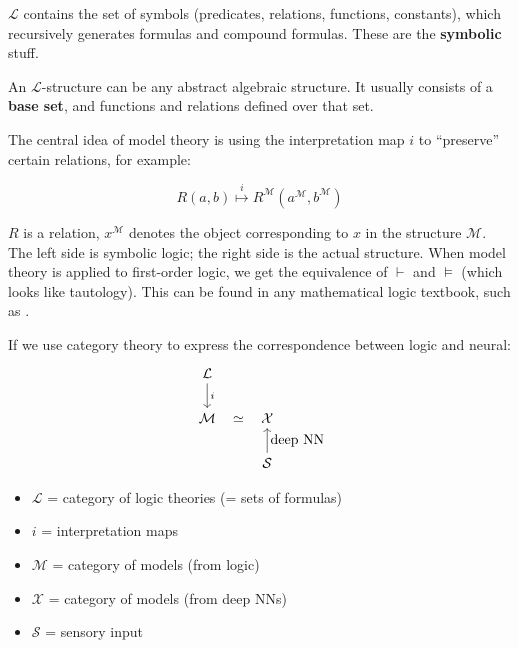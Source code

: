 \documentclass[orivec]{llncs}
\begin{document}
$\mathcal{L}$ contains the set of symbols (predicates, relations, functions, constants), which recursively generates formulas and compound formulas.  These are the \textbf{symbolic} stuff.


An $\mathcal{L}$-structure can be any abstract algebraic structure.  It usually consists of a \textbf{base set}, and functions and relations defined over that set.


The central idea of model theory is using the interpretation map $i$ to ``preserve'' certain relations, for example:

\begin{equation}
R(a,b) \stackrel{i}{\mapsto} R^\mathcal{M}(a^\mathcal{M}, b^\mathcal{M})
\end{equation}

$R$ is a relation, $x^\mathcal{M}$ denotes the object corresponding to $x$ in the structure $\mathcal{M}$.  The left side is symbolic logic;  the right side is the actual structure.  When model theory is applied to first-order logic, we get the equivalence of $\vdash$ and $\vDash$ (which looks like tautology).  This can be found in any mathematical logic textbook, such as \cite{Hedman2004}.


If we use category theory to express the correspondence between logic and neural:
\begin{equation}
\begin{tikzcd}[]
\mathcal{L} \arrow[d, "i"] \\
\mathcal{M} \arrow[r, phantom, "\simeq"] & \mathcal{X} \\
& \arrow[u, "\mbox{deep NN}" swap] \mathcal{S}
\end{tikzcd}
\end{equation}
\begin{itemize}
\item $\mathcal{L}$ = category of logic theories (= sets of formulas)
\item $i$ = interpretation maps
\item $\mathcal{M}$ = category of models (from logic)
\item $\mathcal{X}$ = category of models (from deep NNs)
\item $\mathcal{S}$ = sensory input
\end{itemize}
\end{document}
